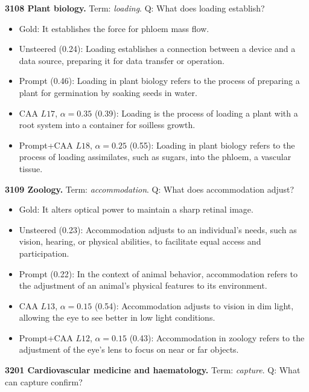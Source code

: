 \medskip\noindent\textbf{3108 Plant biology.} Term: \emph{loading}.
Q: What does loading establish?
\begin{itemize}\setlength{\itemsep}{0.15em}\setlength{\parsep}{0pt}\setlength{\topsep}{0.2em}
\item Gold: It establishes the force for phloem mass flow.
\item Unsteered (0.24): Loading establishes a connection between a device and a data source, preparing it for data transfer or operation.
\item Prompt (0.46): Loading in plant biology refers to the process of preparing a plant for germination by soaking seeds in water.
\item CAA $L17$, $\alpha=0.35$ (0.39): Loading is the process of loading a plant with a root system into a container for soilless growth.
\item Prompt+CAA $L18$, $\alpha=0.25$ (0.55): Loading in plant biology refers to the process of loading assimilates, such as sugars, into the phloem, a vascular tissue.
\end{itemize}
\medskip\noindent\textbf{3109 Zoology.} Term: \emph{accommodation}.
Q: What does accommodation adjust?
\begin{itemize}\setlength{\itemsep}{0.15em}\setlength{\parsep}{0pt}\setlength{\topsep}{0.2em}
\item Gold: It alters optical power to maintain a sharp retinal image.
\item Unsteered (0.23): Accommodation adjusts to an individual's needs, such as vision, hearing, or physical abilities, to facilitate equal access and participation.
\item Prompt (0.22): In the context of animal behavior, accommodation refers to the adjustment of an animal's physical features to its environment.
\item CAA $L13$, $\alpha=0.15$ (0.54): Accommodation adjusts to vision in dim light, allowing the eye to see better in low light conditions.
\item Prompt+CAA $L12$, $\alpha=0.15$ (0.43): Accommodation in zoology refers to the adjustment of the eye's lens to focus on near or far objects.
\end{itemize}
\medskip\noindent\textbf{3201 Cardiovascular medicine and haematology.} Term: \emph{capture}.
Q: What can capture confirm?
